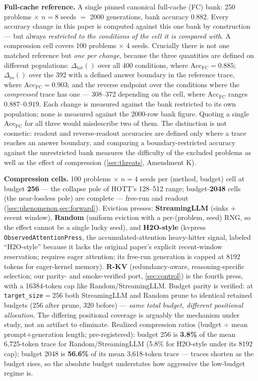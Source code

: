 \documentclass{article}
\newcommand{\accfc}{\mathrm{Acc}_{\mathrm{FC}}}
\newcommand{\dtot}[1]{\Delta_{\mathrm{tot}}(#1)}
\newcommand{\dro}[1]{\Delta_{\mathrm{ro}}(#1)}
\begin{document}
\textbf{Full-cache reference.} A single pinned canonical full-cache (FC) bank: 250 problems $\times$ $n{=}8$ seeds $=$ 2000 generations, bank accuracy $0.882$. Every accuracy change in this paper is computed against this one bank by construction --- but always \emph{restricted to the conditions of the cell it is compared with}. A compression cell covers 100 problems $\times$ 4 seeds. Crucially there is not one matched reference but \emph{one per change}, because the three quantities are defined on different populations: $\dtot{}$ over all 400 conditions, where $\accfc = 0.885$; $\dro{}$ over the 392 with a defined answer boundary in the reference trace, where $\accfc = 0.903$; and the reverse endpoint over the conditions where the \emph{compressed} trace has one --- 308--372 depending on the cell, where $\accfc$ ranges $0.887$--$0.919$. Each change is measured against the bank restricted to its own population; none is measured against the 2000-row bank figure. Quoting a single $\accfc$ for all three would misdescribe two of them. The distinction is not cosmetic: readout and reverse-readout accuracies are defined only where a trace reaches an answer boundary, and comparing a boundary-restricted accuracy against the unrestricted bank measures the difficulty of the excluded problems as well as the effect of compression (\cref{sec:threats}, Amendment K).

\textbf{Compression cells.} 100 problems $\times$ $n{=}4$ seeds per (method, budget) cell at budget \textbf{256} --- the collapse pole of HOTT's 128--512 range; budget-\textbf{2048} cells (the near-lossless pole) are complete --- free-run and readout (\cref{sec:phenomenon,sec:forward}). Eviction presses: \textbf{StreamingLLM} (sinks $+$ recent window), \textbf{Random} (uniform eviction with a per-(problem, seed) RNG, so the effect cannot be a single lucky seed), and \textbf{H2O-style} (kvpress \texttt{ObservedAttentionPress}, the accumulated-attention heavy-hitter signal, labeled ``H2O-style'' because it lacks the original paper's explicit recent-window reservation; requires eager attention; its free-run generation is capped at 8192 tokens for eager-kernel memory). \textbf{R-KV} (redundancy-aware, reasoning-specific selection; our parity- and smoke-verified port, \cref{sec:control}) is the fourth press, with a 16384-token cap like Random/StreamingLLM. Budget parity is verified: at \texttt{target\_size}$=256$ both StreamingLLM and Random prune to identical retained budgets (256 after prune, 320 before) --- \emph{same total budget, different positional allocation}. The differing positional coverage is arguably the mechanism under study, not an artifact to eliminate. Realized compression ratios (budget $\div$ mean prompt$+$generation length; pre-registered): budget 256 is \textbf{3.8\%} of the mean 6{,}725-token trace for Random/StreamingLLM (5.8\% for H2O-style under its 8192 cap); budget 2048 is \textbf{56.6\%} of its mean 3{,}618-token trace --- traces shorten as the budget rises, so the absolute budget understates how aggressive the low-budget regime is.
\end{document}
